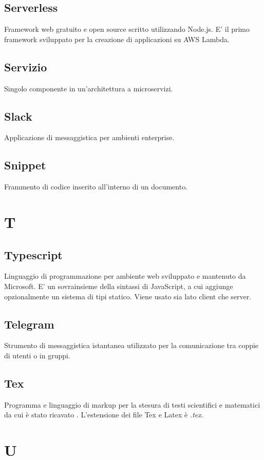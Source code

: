 \subsection*{Serverless}
Framework web gratuito e open source scritto utilizzando Node.js. E' il primo framework sviluppato per la creazione di applicazioni su AWS Lambda.

\subsection*{Servizio}
Singolo componente in un'architettura a microservizi.

\subsection*{Slack}
Applicazione di messaggistica per ambienti enterprise.

\subsection*{Snippet}
Frammento di codice inserito all'interno di un documento.

\section*{T}
\subsection*{Typescript}
Linguaggio di programmazione per ambiente web sviluppato e mantenuto da Microsoft. E' un sovrainsieme della sintassi di JavaScript,
a cui aggiunge opzionalmente un sistema di tipi statico. Viene usato sia lato client che server.
\subsection*{Telegram}
Strumento di messaggistica istantanea utilizzato per la comunicazione tra coppie di utenti o in gruppi.

\subsection*{Tex}
Programma e linguaggio di markup per la stesura di testi scientifici e matematici da cui è stato ricavato . L'estensione dei file Tex e Latex è \textit{.tex}.

\section*{U}

